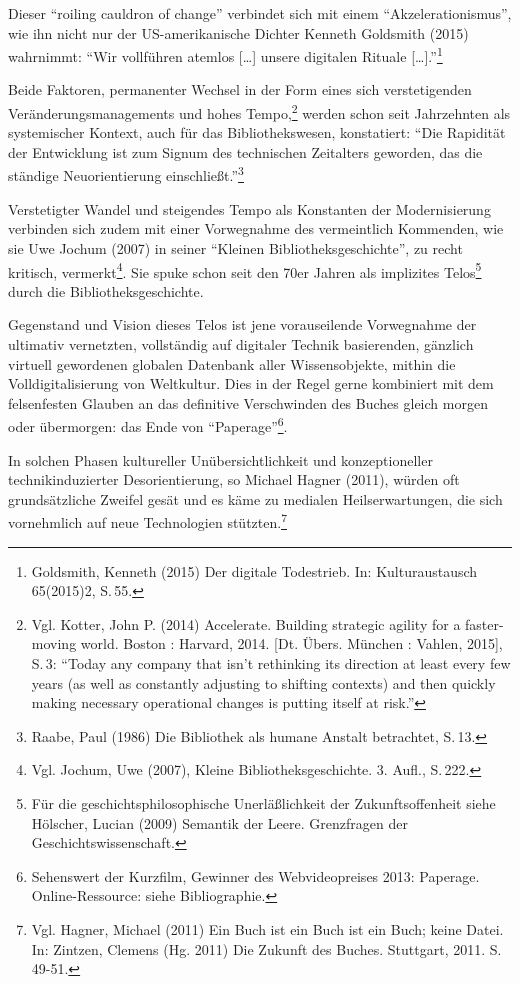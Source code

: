 \documentclass[a4paper,
fontsize=11pt,
oneside,
numbers=noperiodatend,
parskip=half-,
bibliography=totoc,
final
]{scrartcl}
\begin{document}
Dieser \enquote{roiling cauldron of change} verbindet sich mit einem
\enquote{Akzelerationismus}, wie ihn nicht nur der US-amerikanische
Dichter Kenneth Goldsmith (2015) wahrnimmt: \enquote{Wir vollführen
atemlos {[}\ldots{}{]} unsere digitalen Rituale
{[}\ldots{}{]}.}\footnote{Goldsmith, Kenneth (2015) Der digitale
  Todestrieb. In: Kulturaustausch 65(2015)2, S.\,55.}

Beide Faktoren, permanenter Wechsel in der Form eines sich
verstetigenden Veränderungsmanagements und hohes Tempo,\footnote{Vgl.
  Kotter, John P. (2014) Accelerate. Building strategic agility for a
  faster-moving world. Boston : Harvard, 2014. {[}Dt. Übers. München :
  Vahlen, 2015{]}, S.\,3: \enquote{Today any company that isn't
  rethinking its direction at least every few years (as well as
  constantly adjusting to shifting contexts) and then quickly making
  necessary operational changes is putting itself at risk.}} werden
schon seit Jahrzehnten als systemischer Kontext, auch für das
Bibliothekswesen, konstatiert: \enquote{Die Rapidität der Entwicklung
ist zum Signum des technischen Zeitalters geworden, das die ständige
Neuorientierung einschließt.}\footnote{Raabe, Paul (1986) Die Bibliothek
  als humane Anstalt betrachtet, S.\,13.}

Verstetigter Wandel und steigendes Tempo als Konstanten der
Modernisierung verbinden sich zudem mit einer Vorwegnahme des
vermeintlich Kommenden, wie sie Uwe Jochum (2007) in seiner
\enquote{Kleinen Bibliotheksgeschichte}, zu recht kritisch,
vermerkt\footnote{Vgl. Jochum, Uwe (2007), Kleine Bibliotheksgeschichte.
  3. Aufl., S.\,222.}. Sie spuke schon seit den 70er Jahren als
implizites Telos\footnote{Für die geschichtsphilosophische
  Unerläßlichkeit der Zukunftsoffenheit siehe Hölscher, Lucian (2009)
  Semantik der Leere. Grenzfragen der Geschichtswissenschaft.} durch die
Bibliotheksgeschichte.

Gegenstand und Vision dieses Telos ist jene vorauseilende Vorwegnahme
der ultimativ vernetzten, vollständig auf digitaler Technik basierenden,
gänzlich virtuell gewordenen globalen Datenbank aller Wissensobjekte,
mithin die Volldigitalisierung von Weltkultur. Dies in der Regel gerne
kombiniert mit dem felsenfesten Glauben an das definitive Verschwinden
des Buches gleich morgen oder übermorgen: das Ende von
\enquote{Paperage}\footnote{Sehenswert der Kurzfilm, Gewinner des
  Webvideopreises 2013: Paperage. Online-Ressource: siehe Bibliographie.}.

In solchen Phasen kultureller Unübersichtlichkeit und konzeptioneller
technikinduzierter Desorientierung, so Michael Hagner (2011), würden oft
grundsätzliche Zweifel gesät und es käme zu medialen Heilserwartungen,
die sich vornehmlich auf neue Technologien stützten.\footnote{Vgl.
  Hagner, Michael (2011) Ein Buch ist ein Buch ist ein Buch; keine
  Datei. In: Zintzen, Clemens (Hg. 2011) Die Zukunft des Buches.
  Stuttgart, 2011. S.\,49-51.}
\end{document}
